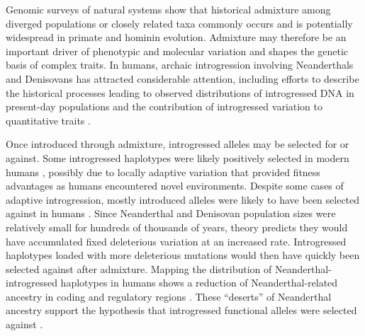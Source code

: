 \documentclass{article}
\begin{document}
Genomic surveys of natural systems show that historical admixture among
diverged populations or closely related taxa commonly occurs
\citep{brandvain2014speciation, skoglund2015ancient, suvorov2022widespread} and
is potentially widespread in primate \citep{tung2017contribution,
sorensen2023genome} and hominin \citep{wolf2018outstanding, peter2020100}
evolution. Admixture may therefore be an important driver of phenotypic and
molecular variation and shapes the genetic basis of complex traits. In humans,
archaic introgression involving Neanderthals and Denisovans has attracted
considerable attention, including efforts to describe the historical processes
leading to observed distributions of introgressed DNA in present-day
populations \citep{prufer2014complete, villanea2019multiple,
chen2020identifying} and the contribution of introgressed variation to
quantitative traits \citep{sankararaman2016combined, wei2023lingering}.

Once introduced through admixture, introgressed alleles may be selected for or
against. Some introgressed haplotypes were likely positively selected in modern
humans \citep{huerta2014altitude, racimo2017signatures, enard2018evidence,
gower2021detecting}, possibly due to locally adaptive variation that provided
fitness advantages as humans encountered novel environments. Despite some cases
of adaptive introgression, mostly introduced alleles were likely to have been
selected against in humans \citep{harris2016genetic, juric2016strength}. Since
Neanderthal and Denisovan population sizes were relatively small for hundreds
of thousands of years, theory predicts they would have accumulated fixed
deleterious variation at an increased rate. Introgressed haplotypes loaded with
more deleterious mutations would then have quickly been selected against after
admixture. Mapping the distribution of Neanderthal-introgressed haplotypes in
humans shows a reduction of Neanderthal-related ancestry in coding and
regulatory regions \citep{petr2019limits, telis2020selection,
yermakovich2023long}. These ``deserts'' of Neanderthal ancestry support the
hypothesis that introgressed functional alleles were selected against
\citep{sankararaman2014genomic, sankararaman2016combined}.
\end{document}
